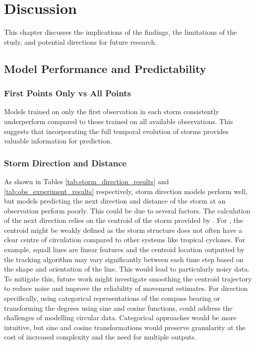 \chapter{Discussion}
\label{ch:discuss}

This chapter discusses the implications of the findings, the limitations of the study, and potential directions for future research.

\section{Model Performance and Predictability}

\subsection{First Points Only vs All Points}

Models trained on only the first observation in each storm consistently underperform compared to those trained on all available observations. This suggests that incorporating the full temporal evolution of storms provides valuable information for prediction.

\subsection{Storm Direction and Distance}

As shown in Tables \ref{tab:storm_direction_results} and \ref{tab:obs_experiment_results} respectively, storm direction models perform well, but models predicting the next direction and distance of the storm at an observation perform poorly. This could be due to several factors. The calculation of the next direction relies on the centroid of the storm provided by \cite{Hill2023}. For , the centroid might be weakly defined as the storm structure does not often have a clear centre of circulation compared to other systems like tropical cyclones. For example, squall lines are linear features and the centroid location outputted by the tracking algorithm may vary significantly between each time step based on the shape and orientation of the line. This would lead to particularly noisy data. To mitigate this, future work might investigate smoothing the centroid trajectory to reduce noise and improve the reliability of movement estimates. For direction specifically, using categorical representations of the compass bearing or transforming the degrees using sine and cosine functions, could address the challenges of modelling circular data. Categorical approaches would be more intuitive, but sine and cosine transformations would preserve granularity at the cost of increased complexity and the need for multiple outputs.

